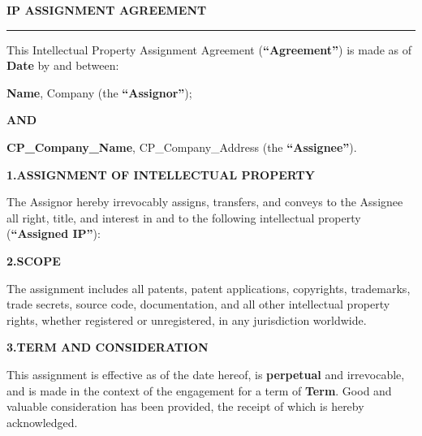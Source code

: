 \documentclass[9.5pt]{article}
\begin{document}
\vspace*{18pt}

{\fontsize{14pt}{17pt}\selectfont\bfseries\color{t2ldark}IP ASSIGNMENT AGREEMENT}\par\vspace{2pt}
{\color{refgold}\rule{\linewidth}{1pt}}\par\vspace{8pt}

{\fontsize{9.5pt}{13.5pt}\selectfont\color{refcharcoal}

This Intellectual Property Assignment Agreement (\textbf{``Agreement''}) is made
as of \textbf{{{Date}}} by and between:

\vspace{5pt}
\textbf{{{Name}}}, {{Company}} (the \textbf{``Assignor''});

\vspace{3pt}\textbf{AND}\vspace{3pt}

\textbf{{{CP_Company_Name}}}, {{CP_Company_Address}} (the \textbf{``Assignee''}).

\vspace{5pt}
\textbf{\color{t2ldark}1.\enspace ASSIGNMENT OF INTELLECTUAL PROPERTY}

The Assignor hereby irrevocably assigns, transfers, and conveys to the Assignee
all right, title, and interest in and to the following intellectual property
(\textbf{``Assigned IP''}):

\vspace{3pt}

\vspace{5pt}
\textbf{\color{t2ldark}2.\enspace SCOPE}

The assignment includes all patents, patent applications, copyrights,
trademarks, trade secrets, source code, documentation, and all other
intellectual property rights, whether registered or unregistered, in any
jurisdiction worldwide.

\vspace{5pt}
\textbf{\color{t2ldark}3.\enspace TERM AND CONSIDERATION}

This assignment is effective as of the date hereof, is \textbf{perpetual} and
irrevocable, and is made in the context of the engagement for a term of
\textbf{{{Term}}}. Good and valuable consideration has been provided, the
receipt of which is hereby acknowledged.

}
\end{document}
